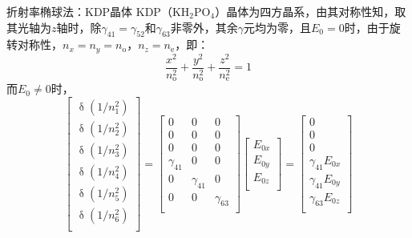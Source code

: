 \documentclass{beamer}
\newenvironment{slide}{
    \begin{frame}{\bfseries{\sectiontitle}}
}{
    \end{frame}
}
\begin{document}
\begin{slide}{折射率椭球法：KDP晶体}
    KDP（$\mathrm{KH_2PO_4}$）晶体为四方晶系，由其对称性知，取其光轴为$z$轴时，除$\gamma_{41} = \gamma_{52}$和$\gamma_{63}$非零外，其余$\gamma$元均为零，且$E_0 = 0$时，由于旋转对称性，$n_x = n_y = n_{\mathrm{o}}$，$n_z = n_{\mathrm{e}}$，即：
    \[
        \frac{x^2}{n_{\mathrm{o}}^2} + \frac{y^2}{n_{\mathrm{o}}^2} + \frac{z^2}{n_{\mathrm{e}}^2} = 1
    \]
    而$E_0 \neq 0$时，
    \[
        \begin{bmatrix}
            \updelta(1 / n_1^2) \\
            \updelta(1 / n_2^2) \\
            \updelta(1 / n_3^2) \\
            \updelta(1 / n_4^2) \\
            \updelta(1 / n_5^2) \\
            \updelta(1 / n_6^2) \\
          \end{bmatrix} =
          \begin{bmatrix}
            0           & 0           & 0           \\
            0           & 0           & 0           \\
            0           & 0           & 0           \\
            \gamma_{41} & 0           & 0           \\
            0           & \gamma_{41} & 0           \\
            0           & 0           & \gamma_{63} \\
          \end{bmatrix}
          \begin{bmatrix}
            E_{0x} \\
            E_{0y} \\
            E_{0z} \\
          \end{bmatrix} =
          \begin{bmatrix}
            0 \\
            0 \\
            0 \\
            \gamma_{41}E_{0x} \\
            \gamma_{41}E_{0y} \\
            \gamma_{63}E_{0z} \\
          \end{bmatrix}
    \]
\end{slide}
\end{document}
